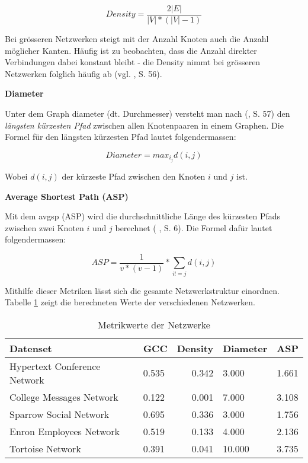 \begin{equation}
    \label{eq:density}
    Density = \frac{2|E|}{|V|*(|V|-1)}
\end{equation}


Bei grösseren Netzwerken steigt mit der Anzahl Knoten auch die Anzahl möglicher Kanten.
Häufig ist zu beobachten, dass die Anzahl direkter Verbindungen dabei konstant bleibt - die Density nimmt bei grösseren Netzwerken folglich häufig ab (vgl. \citeauthor{michael_henninger_soziale_2018} \citeyear{michael_henninger_soziale_2018}, S. 56).

\textbf{Diameter}

Unter dem Graph \acs{diameter} (dt. Durchmesser) versteht man nach \citeauthor{michael_henninger_soziale_2018} (\citeyear{michael_henninger_soziale_2018}, S. 57) den \textit{längsten kürzesten Pfad} zwischen allen Knotenpaaren in einem Graphen.
Die Formel für den längsten kürzesten Pfad lautet folgendermassen:

\begin{equation}
    \label{eq:diameter}
    Diameter = max_i_jd(i,j)
\end{equation}

Wobei $d(i,j)$ der kürzeste Pfad zwischen den Knoten $i$ und $j$ ist.

\textbf{Average Shortest Path (ASP)}

Mit dem \acs{avgsp} (ASP) wird die durchschnittliche Länge des kürzesten Pfads zwischen zwei Knoten $i$ und $j$ berechnet (\citeauthor{gao_link_2015} \citeyear{gao_link_2015}, S. 6).
Die Formel dafür lautet folgendermassen:

\begin{equation}
    \label{eq:asp}
    ASP = \frac{1}{v * (v - 1)} * \sum\limits_{i!=j} d(i,j)
\end{equation}

Mithilfe dieser Metriken lässt sich die gesamte Netzwerkstruktur einordnen.
Tabelle \ref{tab_metrics} zeigt die berechneten Werte der verschiedenen Netzwerken.

\begin{table}[h]
    \centering
    \begin{tabular}{@{}llrll@{}}
        \toprule
        Datenset                         & GCC      & Density      & Diameter & ASP      \\ \midrule
        Hypertext Conference Network                & 0.535 & 0.342 & 3.000 & 1.661 \\
        College Messages Network         & 0.122 & 0.001 & 7.000 & 3.108 \\
        Sparrow Social Network           & 0.695 & 0.336 & 3.000 & 1.756 \\
        Enron Employees Network          & 0.519 & 0.133 & 4.000 & 2.136 \\
        Tortoise Network                 & 0.391 & 0.041 & 10.000 & 3.735 \\ \bottomrule
    \end{tabular}%
    \caption{Metrikwerte der Netzwerke}
    \label{tab_metrics}
\end{table}

